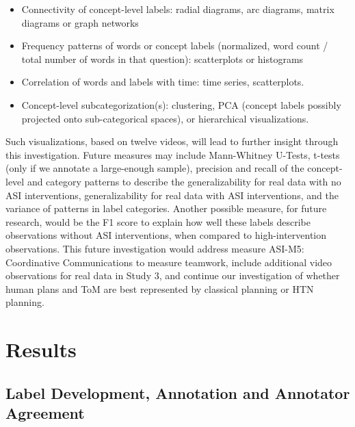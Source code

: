 \begin{itemize}

    \item Connectivity of concept-level labels: radial diagrams, arc diagrams,
        matrix diagrams or graph networks

    \item Frequency patterns of words or concept labels (normalized, word count
        / total number of words in that question): scatterplots or histograms

    \item Correlation of words and labels with time: time series, scatterplots. 

    \item Concept-level subcategorization(s): clustering, PCA (concept labels
        possibly projected onto sub-categorical spaces), or hierarchical
        visualizations.

\end{itemize}


Such visualizations, based on twelve videos, will lead to further insight
through this investigation. Future measures may include Mann-Whitney U-Tests,
t-tests (only if we annotate a large-enough sample), precision and recall of
the concept-level and category patterns to describe the generalizability for
real data with no ASI interventions, generalizability for real data with ASI
interventions, and the variance of patterns in label categories. Another
possible measure, for future research, would be the F1 score to explain how
well these labels describe observations without ASI interventions, when
compared to high-intervention observations. This future investigation would
address measure ASI-M5: Coordinative Communications to
measure teamwork, include additional video observations for real data in Study
3, and continue our investigation of whether human plans and ToM are best
represented by classical planning or HTN planning.



\section{Results}

\subsection{Label Development, Annotation and Annotator Agreement}


